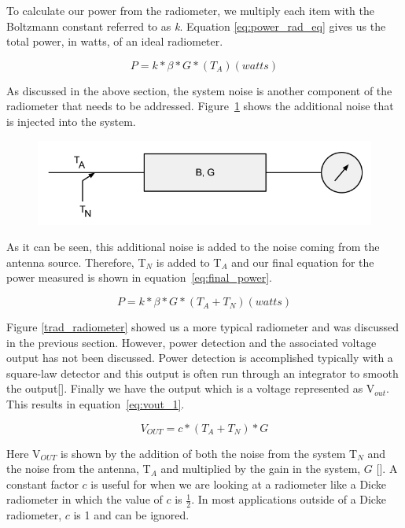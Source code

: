 To calculate our power from the radiometer, we multiply each item with the Boltzmann constant referred to as \textit{k}. Equation \ref{eq:power_rad_eq} gives us the total power, in watts, of an ideal radiometer.

\begin{equation} \label{eq:power_rad_eq}
P=k*\beta*G*(T_{A}) (watts)
\end{equation}

As discussed in the above section, the system noise is another component of the radiometer that needs to be addressed.  Figure~\ref{noiserad} shows the additional noise that is injected into the system.

{\begin{figure}[h!tb] 
\centering
\includegraphics[width=\textwidth]{Images/radiometer_noise_added.png}
\label{noiserad}
\end{figure}
}

As it can be seen, this additional noise is added to the noise coming from the antenna source.  Therefore, T$_{N}$ is added to T$_{A}$ and our final equation for the power measured is shown in equation~\ref{eq:final_power}.  

\begin{equation} \label{eq:final_power}
P=k*\beta*G*(T_{A}+T_{N}) (watts)
\end{equation}

Figure \ref{trad_radiometer} showed us a more typical radiometer and was discussed in the previous section.  However, power detection and the associated voltage output has not been discussed.  Power detection is accomplished typically with a square-law detector and this output is often run through an integrator to smooth the output[\cite{Leinweber}].  Finally we have the output which is a voltage represented as V$_{out}$.  This results in equation~\ref{eq:vout_1}.

\begin{equation} \label{eq:vout_1}
V_{OUT}=c*(T_A+T_N)*G
\end{equation}

Here V$_{OUT}$ is shown by the addition of both the noise from the system T$_N$ and the noise from the antenna, T$_A$ and multiplied by the gain in the system, $G$ [\cite{skou}].  A constant factor $c$ is useful for when we are looking at a radiometer like a Dicke radiometer in which the value of $c$ is $\frac{1}{2}$.  In most applications outside of a Dicke radiometer, $c$ is 1 and can be ignored.  

